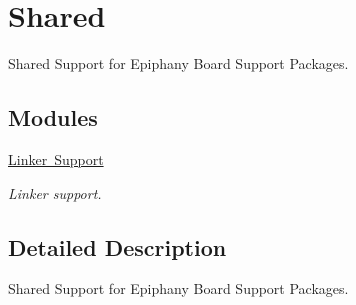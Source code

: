 \hypertarget{group__RTEMSBSPsEpiphanyShared}{}\section{Shared}
\label{group__RTEMSBSPsEpiphanyShared}


Shared Support for Epiphany Board Support Packages.  


\subsection*{Modules}
\begin{DoxyCompactItemize}
\item 
\mbox{\hyperlink{group__epiphany__linker}{Linker Support}}
\begin{DoxyCompactList}\small\item\em Linker support. \end{DoxyCompactList}\end{DoxyCompactItemize}


\subsection{Detailed Description}
Shared Support for Epiphany Board Support Packages. 

